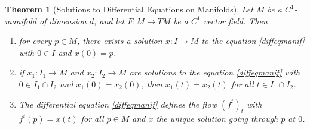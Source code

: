 \documentclass[11pt, a4paper]{memoir}
\theoremstyle{break}
\newtheorem{thm}{Theorem}
\theoremstyle{break}
\theoremstyle{nonumberplain}
\begin{document}
\begin{thm}[Solutions to Differential Equations on Manifolds]\label{ThmManifDiffEq}
Let $M$ be a $C^1$-manifold of dimension $d$, and let $F:M\to TM$ be a $C^1$ vector field. Then
\begin{enumerate}[label=(\roman*)]
	\item for every $p\in M$, there exists a solution $x:I\to M$ to the equation \ref{diffeqmanif} with $0\in I$ and $x(0)=p$.
	\item if $x_1:I_1\to M$ and $x_2:I_2\to M$ are solutions to the equation \ref{diffeqmanif} with $0\in I_1\cap I_2$ and $x_1(0)=x_2(0)$, then $x_1(t)=x_2(t)$ for all $t\in I_1\cap I_2$.
	\item The differential equation \ref{diffeqmanif} defines the flow $(f^t)_t$ with $f^t(p)=x(t)$ for all $p\in M$ and $x$ the unique solution going through $p$ at $0$.
\end{enumerate}

\end{thm}
\end{document}
